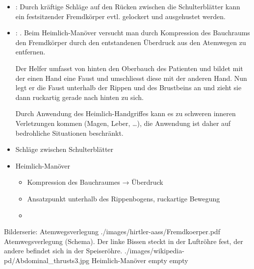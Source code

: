 {%
\begin{itemize}
  \item {}:
  Durch kräftige Schläge auf den Rücken zwischen die
  Schulterblätter kann  ein festsitzender Fremdkörper evtl.
  gelockert und ausgehustet werden.
  \item {}:
  \label{topic:heimlich-manoever}%
   . Beim Heimlich-Manöver
  versucht man durch Kompression des Bauchraums den Fremdkörper
  durch den entstandenen Überdruck aus den Atemwegen zu
  entfernen.
  
  Der Helfer umfasst von hinten den Oberbauch des Patienten und
  bildet mit der einen Hand eine Faust und umschliesst diese
  mit der anderen Hand. Nun legt er die Faust unterhalb der
  Rippen und des Brustbeins an und zieht sie dann ruckartig
  gerade nach hinten zu sich.
  
   Durch Anwendung des
  Heimlich-Handgriffes kann es zu schweren inneren Verletzungen
  kommen (Magen, Leber, \ldots), die Anwendung ist daher auf
  bedrohliche Situationen beschränkt.
\end{itemize}
}{%
\begin{itemize}
  \item Schläge zwischen Schulterblätter
  \item Heimlich-Manöver
  \begin{itemize}
    \item Kompression des Bauchraumes → Überdruck
    \item Ansatzpunkt unterhalb des Rippenbogens, ruckartige Bewegung
    \item {}
  \end{itemize}
\end{itemize}
}
{}
{}
{}


\begin{PictureSeries}{}{Bilderserie: Atemwegsverlegung}
{./images/hirtler-aass/Fremdkoerper.pdf}
{Atemwegsverlegung (Schema). Der linke Bissen steckt in der Luftröhre fest, der
andere befindet sich in der Speiseröhre. }
{./images/wikipedia-pd/Abdominal_thrusts3.jpg}
{Heimlich-Manöver }
{empty}
{}
{empty}
{}
\end{PictureSeries}



